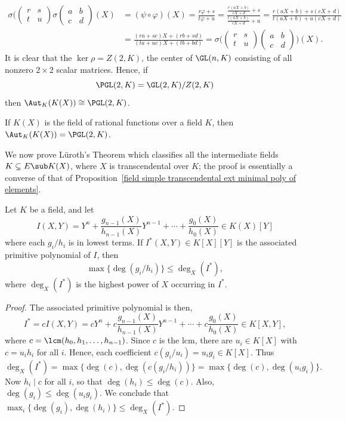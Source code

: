 \begin{align*}
\sigma(\begin{pmatrix}
r&s\\
t&u
\end{pmatrix}\sigma\begin{pmatrix}
a&b\\
c&d
\end{pmatrix}(X)&=(\psi\circ\varphi)(X)=\frac{r\varphi+s}{t\varphi+u}=\frac{\frac{r(aX+b)}{cX+d}+s}{\frac{t(aX+b)}{cX+d}+u}=\frac{r(aX+b)+s(cX+d)}{t(aX+b)+u(cX+d)}\\
&=\frac{(ra+sc)X+(rb+sd)}{(ta+uc)X+(tb+bd)}=\sigma\Big(\begin{pmatrix}
r&s\\
t&u
\end{pmatrix}\begin{pmatrix}
a&b\\
c&d
\end{pmatrix}\Big)(X).
\end{align*}
It is clear that the $\ker\rho=Z(2,K)$, the center of $\GL(n,K)$ consisting of all nonzero $2\times 2$ scalar matrices. Hence, if
\[\PGL(2,K)=\GL(2,K)/Z(2,K)\]
then $\Aut_K(K(X))\cong\PGL(2,K)$.
\begin{corollary}
If $K(X)$ is the field of rational functions over a field $K$, then $\Aut_K(K(X))=\PGL(2,K)$.
\end{corollary}
We now prove L\"uroth's Theorem which classifies all the intermediate fields $K\subsetneq E\sub K(X)$, where $X$ is transcendental over $K$; the proof is essentially a converse of that of Proposition~\ref{field simple transcendental ext minimal poly of elements}.
\begin{lemma}\label{Luroth's Theorem lemma}
Let $K$ be a field, and let
\[I(X,Y)=Y^n+\frac{g_{n-1}(X)}{h_{n-1}(X)}Y^{n-1}+\cdots+\frac{g_0(X)}{h_0(X)}\in K(X)[Y]\]
where each $g_i/h_i$ is in lowest terms. If $I^*(X,Y)\in K[X][Y]$ is the associated primitive polynomial of $I$, then
\[\max\{\deg(g_i/h_i)\}\leq\deg_X(I^*),\]
where $\deg_X(I^*)$ is the highest power of $X$ occurring in $I^*$.
\end{lemma}
\begin{proof}
The associated primitive polynomial is then,
\[I^*=cI(X,Y)=cY^n+c\frac{g_{n-1}(X)}{h_{n-1}(X)}Y^{n-1}+\cdots+c\frac{g_0(X)}{h_0(X)}\in K[X,Y],\]
where $c=\lcm(h_0,h_1,\dots,h_{n-1})$. Since $c$ is the lcm, there are $u_i\in K[X]$ with $c=u_ih_i$ for all $i$. Hence, each coefficient $c(g_i/u_i)=u_ig_i\in K[X]$. Thus
\[\deg_X(I^*)=\max\{\deg(c),\deg(c(g_i/h_i))\}=\max\{\deg(c),\deg(u_ig_i)\}.\]
Now $h_i\mid c$ for all $i$, so that $\deg(h_i)\leq\deg(c)$. Also, $\deg(g_i)\leq\deg(u_ig_i)$. We conclude that $\max_i\{\deg(g_i),\deg(h_i)\}\leq\deg_X(I^*)$.
\end{proof}
